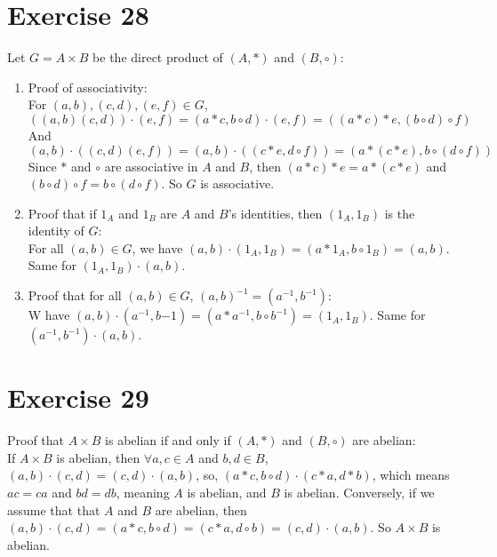 \documentclass[12pt]{article}
\begin{document}
    \section*{Exercise 28}
    Let $G = A \times B$ be the direct product of $(A, \ast)$ and $(B, \circ)$:
    \begin{enumerate}[label=\textbf{\alph*.}]
        \item 
            Proof of associativity: \\
            For $(a, b), (c, d), (e, f) \in G$,
            \[((a, b)(c, d)) \cdot (e, f)
            = (a \ast c, b \circ d) \cdot (e, f)
            = ((a \ast c) \ast e, (b \circ d) \circ f)\]
            And \[(a, b) \cdot ((c, d)(e, f))
            = (a, b) \cdot ((c \ast e, d \circ f))
            = (a \ast (c \ast e), b \circ (d \circ f))\]
            Since $\ast$ and $\circ$ are associative in $A$ and $B$,
            then $(a \ast c) \ast e = a \ast (c \ast e)$
            and $(b \circ d) \circ f = b \circ (d \circ f)$.
            So $G$ is associative.
        \item     
            Proof that if $1_A$ and $1_B$ are $A$ and $B$'s identities,
            then $(1_A, 1_B)$ is the identity of $G$: \\
            For all $(a, b) \in G$,
            we have $(a, b) \cdot (1_A, 1_B)
            = (a \ast 1_A, b \circ 1_B)
            = (a, b)$.
            Same for $(1_A, 1_B) \cdot (a, b)$.
        \item 
            Proof that for all $(a, b) \in G$,
            $(a, b)^{-1} = (a^{-1}, b^{-1})$: \\
            W have $(a, b) \cdot (a^{-1}, b{-1})
            = (a \ast a^{-1}, b \circ b^{-1})
            = (1_A, 1_B)$.
            Same for $(a^{-1}, b^{-1}) \cdot (a, b)$.
    \end{enumerate}


    \section*{Exercise 29}
    Proof that $A \times B$ is abelian
    if and only if $(A, \ast)$ and $(B, \circ)$ are abelian: \\
    If $A \times B $ is abelian,
    then $\forall a, c \in A$ and $b, d \in B$,
    $(a, b) \cdot (c, d) = (c, d) \cdot (a, b)$,
    so, $(a \ast c, b \circ d) \cdot (c \ast a, d \ast b)$,
    which means $ac = ca$ and $bd = db$,
    meaning $A$ is abelian, and $B$ is abelian.
    Conversely, if we assume that that $A$ and $B$ are abelian, 
    then $(a, b) \cdot (c, d)
    = (a \ast c, b \circ d)
    = (c \ast a, d \circ b)
    = (c, d) \cdot (a, b)$.
    So $A \times B$ is abelian. 
\end{document}
